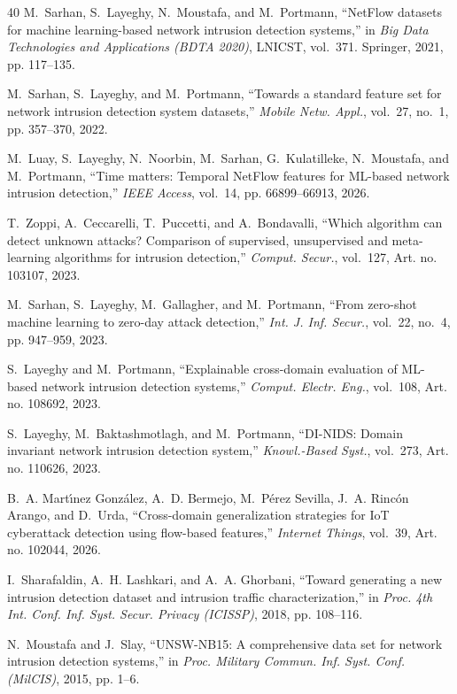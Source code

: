 \begin{thebibliography}{40}
M.~Sarhan, S.~Layeghy, N.~Moustafa, and M.~Portmann, ``NetFlow datasets for machine learning-based network intrusion detection systems,'' in \emph{Big Data Technologies and Applications (BDTA 2020)}, LNICST, vol.~371. Springer, 2021, pp. 117--135.

M.~Sarhan, S.~Layeghy, and M.~Portmann, ``Towards a standard feature set for network intrusion detection system datasets,'' \emph{Mobile Netw. Appl.}, vol.~27, no.~1, pp. 357--370, 2022.

M.~Luay, S.~Layeghy, N.~Noorbin, M.~Sarhan, G.~Kulatilleke, N.~Moustafa, and M.~Portmann, ``Time matters: Temporal NetFlow features for ML-based network intrusion detection,'' \emph{IEEE Access}, vol.~14, pp. 66899--66913, 2026.

T.~Zoppi, A.~Ceccarelli, T.~Puccetti, and A.~Bondavalli, ``Which algorithm can detect unknown attacks? Comparison of supervised, unsupervised and meta-learning algorithms for intrusion detection,'' \emph{Comput. Secur.}, vol.~127, Art. no. 103107, 2023.

M.~Sarhan, S.~Layeghy, M.~Gallagher, and M.~Portmann, ``From zero-shot machine learning to zero-day attack detection,'' \emph{Int. J. Inf. Secur.}, vol.~22, no.~4, pp. 947--959, 2023.

S.~Layeghy and M.~Portmann, ``Explainable cross-domain evaluation of ML-based network intrusion detection systems,'' \emph{Comput. Electr. Eng.}, vol.~108, Art. no. 108692, 2023.

S.~Layeghy, M.~Baktashmotlagh, and M.~Portmann, ``DI-NIDS: Domain invariant network intrusion detection system,'' \emph{Knowl.-Based Syst.}, vol.~273, Art. no. 110626, 2023.

B.~A. Mart\'{\i}nez Gonz\'{a}lez, A.~D. Bermejo, M.~P\'{e}rez Sevilla, J.~A. Rinc\'{o}n Arango, and D.~Urda, ``Cross-domain generalization strategies for IoT cyberattack detection using flow-based features,'' \emph{Internet Things}, vol.~39, Art. no. 102044, 2026.

I.~Sharafaldin, A.~H. Lashkari, and A.~A. Ghorbani, ``Toward generating a new intrusion detection dataset and intrusion traffic characterization,'' in \emph{Proc. 4th Int. Conf. Inf. Syst. Secur. Privacy (ICISSP)}, 2018, pp. 108--116.

N.~Moustafa and J.~Slay, ``UNSW-NB15: A comprehensive data set for network intrusion detection systems,'' in \emph{Proc. Military Commun. Inf. Syst. Conf. (MilCIS)}, 2015, pp. 1--6.


\end{thebibliography}
